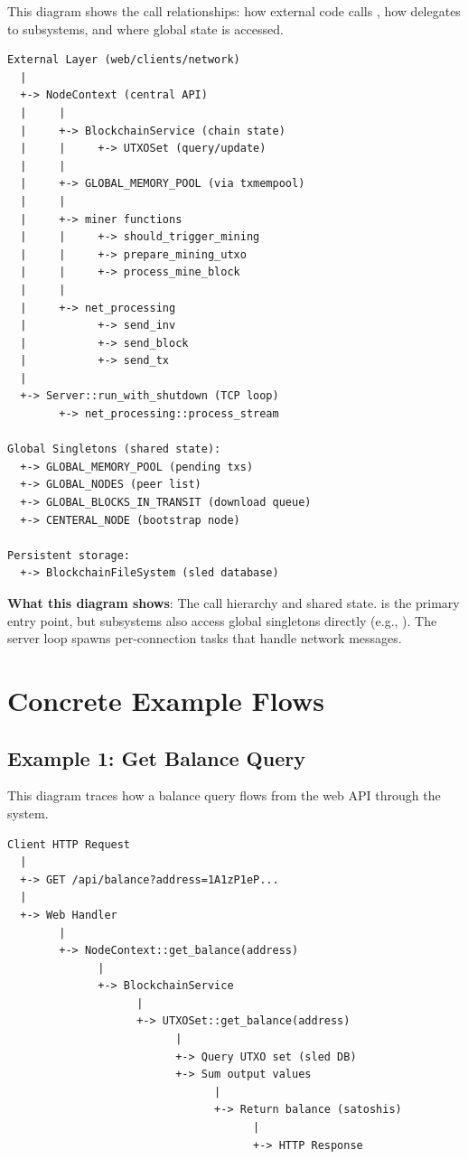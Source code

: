 This diagram shows the call relationships: how external code calls , how  delegates to subsystems, and where global state is accessed.

\begin{verbatim}
External Layer (web/clients/network)
  |
  +-> NodeContext (central API)
  |     |
  |     +-> BlockchainService (chain state)
  |     |     +-> UTXOSet (query/update)
  |     |
  |     +-> GLOBAL_MEMORY_POOL (via txmempool)
  |     |
  |     +-> miner functions
  |     |     +-> should_trigger_mining
  |     |     +-> prepare_mining_utxo
  |     |     +-> process_mine_block
  |     |
  |     +-> net_processing
  |           +-> send_inv
  |           +-> send_block
  |           +-> send_tx
  |
  +-> Server::run_with_shutdown (TCP loop)
        +-> net_processing::process_stream

Global Singletons (shared state):
  +-> GLOBAL_MEMORY_POOL (pending txs)
  +-> GLOBAL_NODES (peer list)
  +-> GLOBAL_BLOCKS_IN_TRANSIT (download queue)
  +-> CENTERAL_NODE (bootstrap node)

Persistent storage:
  +-> BlockchainFileSystem (sled database)
\end{verbatim}

\textbf{What this diagram shows}: The call hierarchy and shared state.  is the primary entry point, but subsystems also access global singletons directly (e.g., ). The server loop spawns per-connection tasks that handle network messages.

\section{Concrete Example Flows}
\label{sec:ch09-8-examples}

\subsection{Example 1: Get Balance Query}
\label{sec:ch09-8-balance}

This diagram traces how a balance query flows from the web API through the system.

\begin{verbatim}
Client HTTP Request
  |
  +-> GET /api/balance?address=1A1zP1eP...
  |
  +-> Web Handler
        |
        +-> NodeContext::get_balance(address)
              |
              +-> BlockchainService
                    |
                    +-> UTXOSet::get_balance(address)
                          |
                          +-> Query UTXO set (sled DB)
                          +-> Sum output values
                                |
                                +-> Return balance (satoshis)
                                      |
                                      +-> HTTP Response
\end{verbatim}

